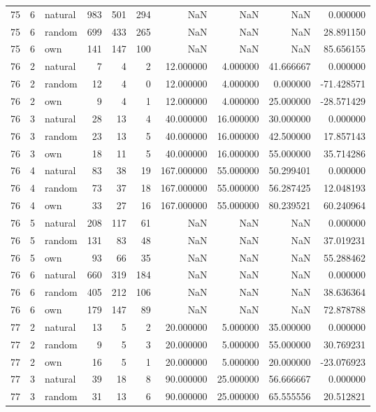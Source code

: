 \begin{table}[htbp]
\begin{tabular}{rrlrrrrrrr}
75 & 6 & natural & 983 & 501 & 294 & NaN & NaN & NaN & 0.000000 \\
75 & 6 & random & 699 & 433 & 265 & NaN & NaN & NaN & 28.891150 \\
75 & 6 & own & 141 & 147 & 100 & NaN & NaN & NaN & 85.656155 \\
76 & 2 & natural & 7 & 4 & 2 & 12.000000 & 4.000000 & 41.666667 & 0.000000 \\
76 & 2 & random & 12 & 4 & 0 & 12.000000 & 4.000000 & 0.000000 & -71.428571 \\
76 & 2 & own & 9 & 4 & 1 & 12.000000 & 4.000000 & 25.000000 & -28.571429 \\
76 & 3 & natural & 28 & 13 & 4 & 40.000000 & 16.000000 & 30.000000 & 0.000000 \\
76 & 3 & random & 23 & 13 & 5 & 40.000000 & 16.000000 & 42.500000 & 17.857143 \\
76 & 3 & own & 18 & 11 & 5 & 40.000000 & 16.000000 & 55.000000 & 35.714286 \\
76 & 4 & natural & 83 & 38 & 19 & 167.000000 & 55.000000 & 50.299401 & 0.000000 \\
76 & 4 & random & 73 & 37 & 18 & 167.000000 & 55.000000 & 56.287425 & 12.048193 \\
76 & 4 & own & 33 & 27 & 16 & 167.000000 & 55.000000 & 80.239521 & 60.240964 \\
76 & 5 & natural & 208 & 117 & 61 & NaN & NaN & NaN & 0.000000 \\
76 & 5 & random & 131 & 83 & 48 & NaN & NaN & NaN & 37.019231 \\
76 & 5 & own & 93 & 66 & 35 & NaN & NaN & NaN & 55.288462 \\
76 & 6 & natural & 660 & 319 & 184 & NaN & NaN & NaN & 0.000000 \\
76 & 6 & random & 405 & 212 & 106 & NaN & NaN & NaN & 38.636364 \\
76 & 6 & own & 179 & 147 & 89 & NaN & NaN & NaN & 72.878788 \\
77 & 2 & natural & 13 & 5 & 2 & 20.000000 & 5.000000 & 35.000000 & 0.000000 \\
77 & 2 & random & 9 & 5 & 3 & 20.000000 & 5.000000 & 55.000000 & 30.769231 \\
77 & 2 & own & 16 & 5 & 1 & 20.000000 & 5.000000 & 20.000000 & -23.076923 \\
77 & 3 & natural & 39 & 18 & 8 & 90.000000 & 25.000000 & 56.666667 & 0.000000 \\
77 & 3 & random & 31 & 13 & 6 & 90.000000 & 25.000000 & 65.555556 & 20.512821 \\

\end{tabular}
\end{table}
